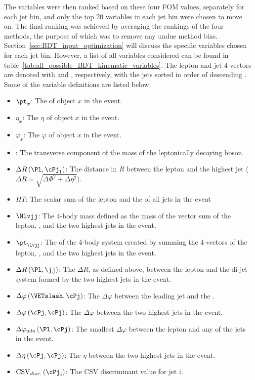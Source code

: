 The variables were then ranked based on these four FOM values, separately for each jet bin, and only the top 20 variables in each jet bin were chosen to move on.
The final ranking was achieved by averaging the rankings of the four methods, the purpose of which was to remove any undue method bias.
Section~\ref{sec:BDT_input_optimization} will discuss the specific variables chosen for each jet bin.
However, a list of all variables considered can be found in table~\ref{tab:all_possible_BDT_kinematic_variables}.
The lepton and jet 4-vectors are denoted with \Pl and \cPj, respectively, with the jets sorted in order of descending \pt.
Some of the variable definitions are listed below:
\begin{itemize}
  \item ${{}\pt}_{x}$: The \pt of object $x$ in the event.
  \item ${{}\eta}_{x}$: The $\eta$ of object $x$ in the event.
  \item ${{}\varphi}_{x}$: The $\varphi$ of object $x$ in the event.
  \item \Mt: The transverse component of the mass of the leptonically decaying \W boson.
  \item $\Delta{R}\left(\Pl,\cPj_{\text{1}}\right)$: The distance in $R$ between the lepton and the highest \pt jet ($\Delta{R}=\sqrt{\Delta\Phi^{2}+\Delta\eta^{2}}$).
  \item $HT$: The scalar sum of the lepton \pt and the \ET of all jets in the event
  \item $\Mlvjj$: The 4-body mass defined as the mass of the vector sum of the lepton, \VETslash, and the two highest \pt jets in the event.
  \item ${{}\pt}_{\lvjj}$: The \pt of the 4-body system created by summing the 4-vectors of the lepton, \VETslash, and the two highest \pt jets in the event.
  \item $\Delta{R}\left(\Pl,\jj\right)$: The $\Delta{R}$, as defined above, between the lepton and the di-jet system formed by the two highest \pt jets in the event. 
  \item $\Delta\varphi\left(\VETslash,\cPj\right)$: The $\Delta\varphi$ between the leading jet and the \VETslash.
  \item $\Delta\varphi\left(\cPj,\cPj\right)$: The $\Delta\varphi$ between the two highest \pt jets in the event.
  \item $\Delta\varphi_{\text{min}}\left(\Pl,\cPj\right)$: The smallest $\Delta\varphi$ between the lepton and any of the jets in the event.
  \item $\Delta\eta\left(\cPj,\cPj\right)$: The $\eta$ between the two highest \pt jets in the event.
  \item $\text{CSV}_{disc.}\left(\cPj_{i}\right)$: The CSV discriminant value for jet $i$.
\end{itemize}

